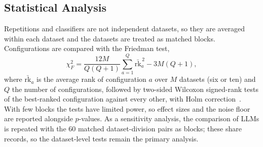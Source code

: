 \documentclass[conference]{IEEEtran}
\begin{document}
\subsection{Statistical Analysis}
Repetitions and classifiers are not independent datasets, so they are averaged within each dataset and the datasets are treated as matched blocks. Configurations are compared with the Friedman test,
\begin{equation}
\chi^2_F=\frac{12M}{Q(Q+1)}\sum_{a=1}^{Q}\bar{\mathrm{rk}}_a^{\,2}-3M(Q+1),
\label{eq:friedman}
\end{equation}
where $\bar{\mathrm{rk}}_a$ is the average rank of configuration $a$ over $M$ datasets (six or ten) and $Q$ the number of configurations, followed by two-sided Wilcoxon signed-rank tests of the best-ranked configuration against every other, with Holm correction~\cite{demsar2006statistical,holm1979procedure}. With few blocks the tests have limited power, so effect sizes and the noise floor are reported alongside $p$-values. As a sensitivity analysis, the comparison of LLMs is repeated with the 60 matched dataset-division pairs as blocks; these share records, so the dataset-level tests remain the primary analysis.

\end{document}
